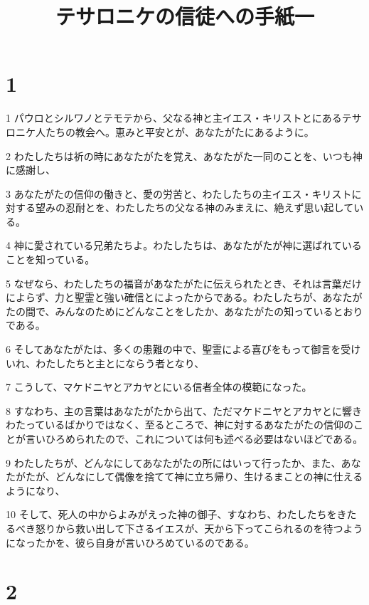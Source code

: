 

\title{テサロニケの信徒への手紙一}


\chapter{1}

\par 1 パウロとシルワノとテモテから、父なる神と主イエス・キリストとにあるテサロニケ人たちの教会へ。恵みと平安とが、あなたがたにあるように。
\par 2 わたしたちは祈の時にあなたがたを覚え、あなたがた一同のことを、いつも神に感謝し、
\par 3 あなたがたの信仰の働きと、愛の労苦と、わたしたちの主イエス・キリストに対する望みの忍耐とを、わたしたちの父なる神のみまえに、絶えず思い起している。
\par 4 神に愛されている兄弟たちよ。わたしたちは、あなたがたが神に選ばれていることを知っている。
\par 5 なぜなら、わたしたちの福音があなたがたに伝えられたとき、それは言葉だけによらず、力と聖霊と強い確信とによったからである。わたしたちが、あなたがたの間で、みんなのためにどんなことをしたか、あなたがたの知っているとおりである。
\par 6 そしてあなたがたは、多くの患難の中で、聖霊による喜びをもって御言を受けいれ、わたしたちと主とにならう者となり、
\par 7 こうして、マケドニヤとアカヤとにいる信者全体の模範になった。
\par 8 すなわち、主の言葉はあなたがたから出て、ただマケドニヤとアカヤとに響きわたっているばかりではなく、至るところで、神に対するあなたがたの信仰のことが言いひろめられたので、これについては何も述べる必要はないほどである。
\par 9 わたしたちが、どんなにしてあなたがたの所にはいって行ったか、また、あなたがたが、どんなにして偶像を捨てて神に立ち帰り、生けるまことの神に仕えるようになり、
\par 10 そして、死人の中からよみがえった神の御子、すなわち、わたしたちをきたるべき怒りから救い出して下さるイエスが、天から下ってこられるのを待つようになったかを、彼ら自身が言いひろめているのである。

\chapter{2}

